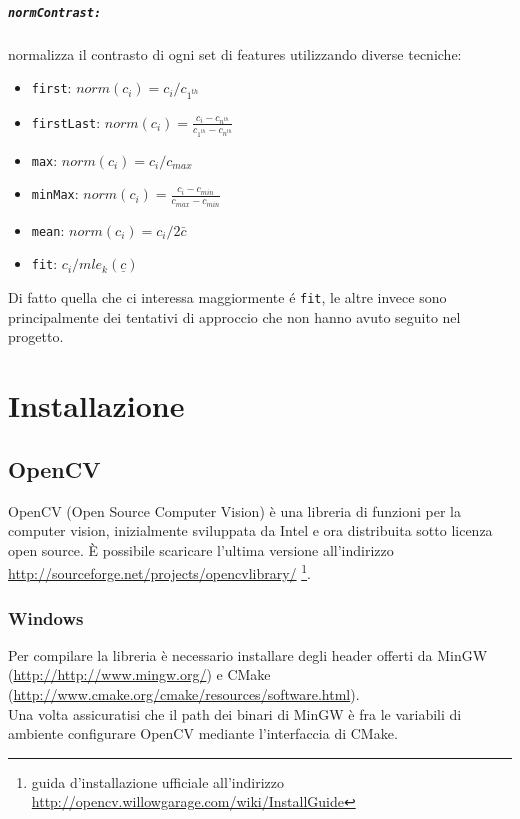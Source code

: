 \documentclass[12pt]{report}
\begin{document}
\paragraph*{\verb_normContrast:_} normalizza il contrasto di ogni set di features utilizzando diverse tecniche:
\begin{itemize}
	\item \verb|first|: $ norm\left(c_i\right) = c_i/c_{1^{th}} $
	\item \verb|firstLast|: $ norm\left(c_i\right) = \frac{c_i-c_{n^{th}}}{c_{1^{th}} - c_{n^{th}}} $
	\item \verb|max|: $ norm\left(c_i\right) = c_i/c_{max} $
	\item \verb|minMax|: $ norm\left(c_i\right) = \frac{c_i-c_{min}}{c_{max} - c_{min}} $
	\item \verb|mean|: $ norm(c_i) = c_i/2\bar{c} $
	\item \verb|fit|: $ c_i / mle_{k}(\underline{c}) $
\end{itemize}

\noindent Di fatto quella che ci interessa maggiormente \'e \verb|fit|, le altre invece sono principalmente dei tentativi di approccio che non hanno avuto seguito nel progetto.

\chapter{Installazione}
\section{OpenCV}
OpenCV (Open Source Computer Vision) \`e una libreria di funzioni per la computer vision, inizialmente sviluppata da Intel e ora distribuita sotto licenza open source. \`E possibile scaricare l'ultima versione all'indirizzo \url{http://sourceforge.net/projects/opencvlibrary/} \footnote{guida d'installazione ufficiale all'indirizzo \url{http://opencv.willowgarage.com/wiki/InstallGuide}}.

\subsection{Windows}
Per compilare la libreria \`e necessario installare degli header offerti da MinGW (\url{http://http://www.mingw.org/}) e CMake (\url{http://www.cmake.org/cmake/resources/software.html}).\\
\noindent Una volta assicuratisi che il path dei binari di MinGW \`e fra le variabili di ambiente configurare OpenCV mediante l'interfaccia di CMake.
\end{document}
